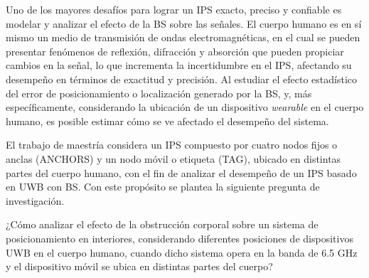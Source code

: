 Uno de los mayores desafíos para lograr un IPS exacto, preciso y confiable es modelar y analizar el efecto de la BS sobre las señales. El cuerpo humano es en sí mismo un medio de transmisión de ondas electromagnéticas, en el cual se pueden presentar fenómenos de reflexión, difracción y absorción que pueden propiciar cambios en la señal, lo que incrementa la incertidumbre en el IPS, afectando su desempeño en términos de exactitud y precisión. Al estudiar el efecto estadístico del error de posicionamiento o localización generado por la BS, y, más específicamente, considerando la ubicación de un dispositivo \textit{wearable} en el cuerpo humano, es posible estimar cómo se ve afectado el desempeño del sistema.

El trabajo de maestría considera un IPS compuesto por cuatro nodos fijos o anclas (ANCHORS) y un nodo móvil o etiqueta (TAG), ubicado en distintas partes del cuerpo humano, con el fin de analizar el desempeño de un IPS basado en UWB con BS. Con este propósito se plantea la siguiente pregunta de investigación.

¿Cómo analizar el efecto de la obstrucción corporal sobre un sistema de posicionamiento en interiores, considerando diferentes posiciones de dispositivos UWB en el cuerpo humano, cuando dicho sistema opera en la banda de 6.5 GHz y el dispositivo móvil se ubica en distintas partes del cuerpo?
